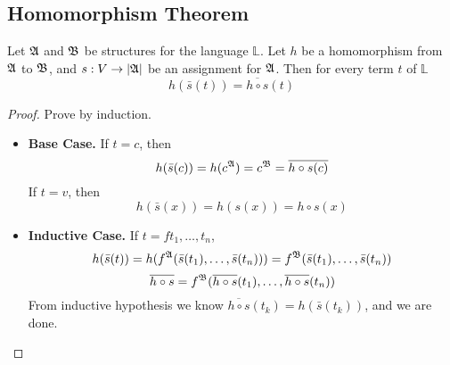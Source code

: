 \subsection{Homomorphism Theorem}

\begin{lemma}
    \label{lem:HomomorphismLemma}
    Let $\mathfrak{A}$ and $\mathfrak{B}$ be structures for the language $\mathbb{L}$. Let $h$ be a homomorphism from $\mathfrak{A}$ to $\mathfrak{B}$, and $s:V\to|\mathfrak{A}|$ be an assignment for $\mathfrak{A}$. Then for every term $t$ of $\mathbb{L}$
    \[ h(\bar{s}(t)) = \overline{h\circ s}(t) \]
\end{lemma}
\begin{proof}
    Prove by induction.
    \begin{itemize}
        \item[] \textbf{Base Case.} If $t=c$, then
        \[ h(\bar{s}(c)) = h(c^{\mathfrak{A}}) = c^{\mathfrak{B}} = \overline{h\circ s(c)} \]
        If $t=v$, then
        \[ h(\bar{s}(x)) = h(s(x)) = h \circ s(x) \]
        \item[] \textbf{Inductive Case.} If $t = ft_1,\dots,t_n$,
        \[ h(\bar{s}(t)) = h(f^{\mathfrak{A}}(\bar{s}(t_1),\dots,\bar{s}(t_n))) = f^{\mathfrak{B}}(\bar{s}(t_1),\dots,\bar{s}(t_n)) \]
        \[ \overline{h\circ s} = f^{\mathfrak{B}}(\overline{h\circ s}(t_1),\dots,\overline{h\circ s}(t_n)) \]
        From inductive hypothesis we know $\overline{h\circ s}(t_k) = h(\bar{s}(t_k))$, and we are done.
    \end{itemize}
\end{proof}

